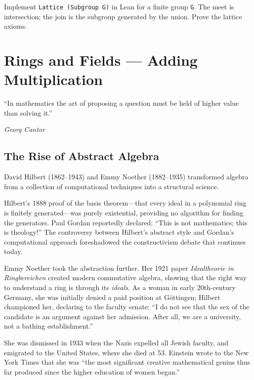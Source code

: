 \documentclass[11pt, a4paper, oneside]{book}
\newcommand{\lc}[1]{\texttt{#1}}
\newcounter{exercise}[chapter]
\begin{document}
\begin{exercisebox}[title={Exercise 3.3}]
Implement \lc{Lattice (Subgroup G)} in Lean for a finite group \lc{G}.
The meet is intersection; the join is the subgroup generated by the union.
Prove the lattice axioms.
\end{exercisebox}

\chapter{Rings and Fields --- Adding Multiplication}

\epigraph{``In mathematics the art of proposing a question must be held of
higher value than solving it.''}{\textit{Georg Cantor}}

\section{The Rise of Abstract Algebra}

\begin{historical}[title={Hilbert, Noether, and the Abstraction Revolution}]
David Hilbert (1862--1943) and Emmy Noether (1882--1935) transformed algebra
from a collection of computational techniques into a structural science.

Hilbert's 1888 proof of the basis theorem---that every ideal in a polynomial
ring is finitely generated---was purely existential, providing no algorithm for
finding the generators. Paul Gordan reportedly declared: ``This is not
mathematics; this is theology!'' The controversy between Hilbert's abstract
style and Gordan's computational approach foreshadowed the constructivism
debate that continues today.

Emmy Noether took the abstraction further. Her 1921 paper \textit{Idealtheorie
in Ringbereichen} created modern commutative algebra, showing that the right
way to understand a ring is through its \emph{ideals}. As a woman in early
20th-century Germany, she was initially denied a paid position at Göttingen;
Hilbert championed her, declaring to the faculty senate: ``I do not see that
the sex of the candidate is an argument against her admission. After all, we
are a university, not a bathing establishment.''

She was dismissed in 1933 when the Nazis expelled all Jewish faculty, and
emigrated to the United States, where she died at 53. Einstein wrote to the
New York Times that she was ``the most significant creative mathematical
genius thus far produced since the higher education of women began.''
\end{historical}
\end{document}
